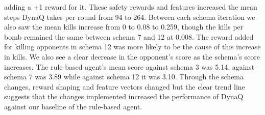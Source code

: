 \documentclass[article, 10pt]{IEEEtran}
\begin{document}
adding a +1 reward for it. These safety rewards and features increased the mean steps DynaQ takes per round from 94 to 264. Between each schema iteration we also saw the mean kills increase from 0 to 0.08 to 0.259, though the kills per bomb remained the same between schema 7 and 12 at 0.008. The reward added for killing opponents in schema 12 was more likely to be the cause of this increase in kills. We also see a clear decrease in the opponent's score as the schema's score increases. The rule-based agent's mean score against schema 3 was 5.14, against schema 7 was 3.89 while against schema 12 it was 3.10. Through the schema changes, reward shaping and feature vectors changed but the clear trend line suggests that the changes implemented increased the performance of DynaQ against our baseline of the rule-based agent.
\end{document}
